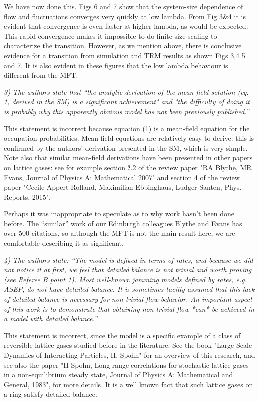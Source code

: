 \documentclass[a4paper,10pt]{article}
\begin{document}
We have now done this.  Figs 6 and 7 show that the system-size
dependence of flow and fluctuations converges very quickly at low
lambda.  From Fig 3\&4 it is evident that convergence is even faster
at higher lambda, as would be expected.  This rapid convergence makes
it impossible to do finite-size scaling to characterize the
transition.  However, as we mention above, there is conclusive
evidence for a transition from simulation and TRM results as shown
Figs 3,4 5 and 7.  It is also evident in these figures that the low
lambda behaviour is different from the MFT.

{\it 
3) The authors state that “the analytic derivation of the mean-field
solution (eq. 1, derived in the SM) is a significant achievement" and
"the difficulty of doing it is probably why this apparently obvious
model has not been previously published.”

This statement is incorrect because equation (1) is a mean-field
equation for the occupation probabilities. Mean-field equations are
relatively easy to derive: this is confirmed by the authors'
derivation presented in the SM, which is very simple. Note also that
similar mean-field derivations have been presented in other papers on
lattice gases: see for example section 2.2 of the review paper "RA
Blythe, MR Evans, Journal of Physics A: Mathematical 2007" and section
4 of the review paper "Cecile Appert-Rolland, Maximilian Ebbinghaus,
Ludger Santen, Phys. Reports, 2015".  } 

Perhaps it was inappropriate to speculate as to why work hasn't been
done before. The ``similar'' work of our Edinburgh colleagues Blythe
and Evans has over 500 citations, so although the MFT is not the main
result here, we are comfortable describing it as significant.

{\it 
4) The authors state: “The model is defined in terms of rates, and
because we did not notice it at first, we feel that detailed balance
is not trivial and worth proving (see Referee B point 1). Most
well-known jamming models defined by rates, e.g. ASEP, do not have
detailed balance. It is sometimes tacitly assumed that this lack of
detailed balance is necessary for non-trivial flow behavior. An
important aspect of this work is to demonstrate that obtaining
non-trivial flow *can* be achieved in a model with detailed balance.”

This statement is incorrect, since the model is a specific example of
a class of reversible lattice gases studied before in the literature.
See the book "Large Scale Dynamics of Interacting Particles, H. Spohn"
for an overview of this research, and see also the paper "H Spohn,
Long range correlations for stochastic lattice gases in a
non-equilibrium steady state, Journal of Physics A: Mathematical and
General, 1983", for more details. It is a well known fact that such
lattice gases on a ring satisfy detailed balance.}
\end{document}
